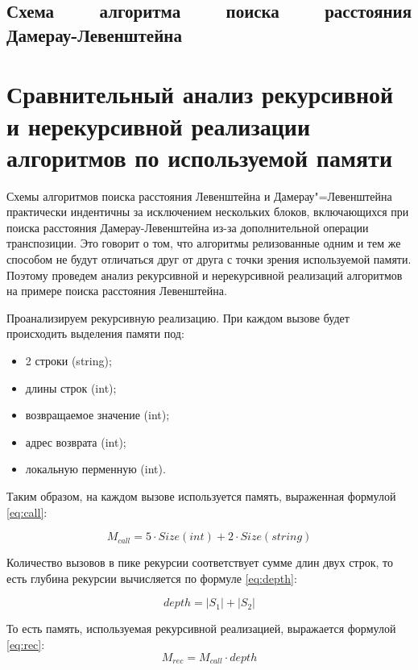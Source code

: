 \clearpage

\subsection[Схема алгоритма поиска расстояния Дамерау-Левенштейна]
           {Схема ~~~~алгоритма ~~~~поиска ~~~~расстояния Дамерау-Левенштейна}
\section{Сравнительный анализ рекурсивной и нерекурсивной реализации
         алгоритмов по используемой памяти}

Схемы алгоритмов поиска расстояния Левенштейна и Дамерау"=Левенштейна
практически индентичны за исключением нескольких блоков, включающихся при
поиска расстояния Дамерау-Левенштейна из-за дополнительной операции
транспозиции. Это говорит о том, что алгоритмы релизованные одним и тем же
способом не будут отличаться друг от друга с точки зрения используемой памяти.
Поэтому проведем анализ рекурсивной и нерекурсивной реализаций алгоритмов на
примере поиска расстояния Левенштейна.

Проанализируем рекурсивную реализацию. При каждом вызове будет происходить
выделения памяти под:
\begin{itemize}
    \item 2 строки (string);
    \item длины строк (int);
    \item возвращаемое значение (int);
    \item адрес возврата (int);
    \item локальную перменную (int).
\end{itemize}

Таким образом, на каждом вызове используется память, выраженная формулой
\ref{eq:call}:

\begin{equation}\label{eq:call}
    M_{call} = 5 \cdot Size(int) + 2 \cdot Size(string)
\end{equation}

Количество вызовов в пике рекурсии соответствует сумме длин двух строк, то есть
глубина рекурсии вычисляется по формуле \ref{eq:depth}:

\begin{equation}\label{eq:depth}
    depth = |S_1| + |S_2|
\end{equation}

То есть память, используемая рекурсивной реализацией, выражается формулой
\ref{eq:rec}:
\begin{equation}\label{eq:rec}
    M_{rec} = M_{call} \cdot depth
\end{equation}

